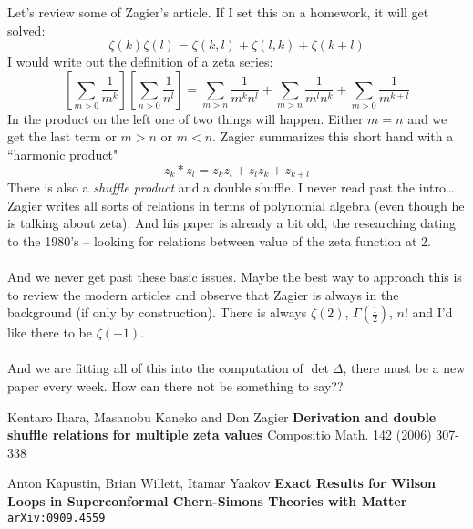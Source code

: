 \documentclass[12pt]{article}
\begin{document}
\noindent Let's review some of Zagier's article.  If I set this on a homework, it will get solved:
$$ \zeta(k) \zeta(l) = \zeta(k,l) + \zeta(l,k) + \zeta(k+l) $$
I would write out the definition of a zeta series:
$$ \left[ \sum_{m>0} \frac{1}{m^k} \right]\left[ \sum_{n>0} \frac{1}{n^l} \right]
= \sum_{m>n} \frac{1}{m^k n^l}
+ \sum_{m>n} \frac{1}{m^l n^k}
+ \sum_{m>0}      \frac{1}{m^{k+l}} $$
In the product on the left one of two things will happen.  Either $m=n$ and we get the last term or $m > n$ or $m < n$.  Zagier summarizes this short hand with a ``harmonic product"
$$ z_k \ast z_l = z_k z_l + z_l z_k + z_{k+l} $$
There is also a \textit{shuffle product}  and a double shuffle.  I never read past the intro\dots Zagier writes all sorts of relations in terms of polynomial algebra (even though he is talking about zeta).  And his paper is already a bit old, the researching dating to the 1980's  -- looking for relations between value of the zeta function at 2. \\ \\
And we never get past these basic issues.  Maybe the best way to approach this is to review the modern articles and observe that Zagier is always in the background (if only by construction).  There is always $\zeta(2)$, $\Gamma(\frac{1}{2})$, $n!$ and I'd like there to be $\zeta(-1)$. \\ \\ And we are fitting all of this into the computation of $\det \Delta$, there must be a new paper every week. How can there not be something to say??

\vfill

\begin{thebibliography}{}

\item Kentaro Ihara, Masanobu Kaneko and Don Zagier \textbf{Derivation and double shuffle relations for multiple zeta values} Compositio Math. 142 (2006) 307-338

\item Anton Kapustin, Brian Willett, Itamar Yaakov \textbf{Exact Results for Wilson Loops in Superconformal Chern-Simons Theories with Matter} \texttt{arXiv:0909.4559}

\end{thebibliography}
\end{document}
